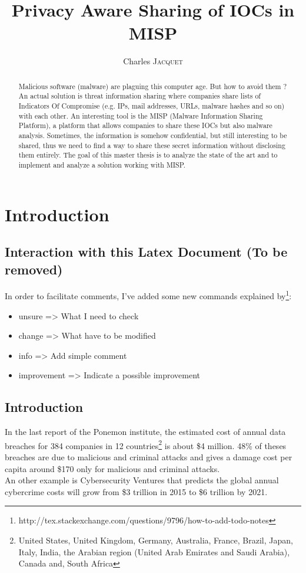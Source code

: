 \documentclass{eplmastersthesis}
\title{Privacy Aware Sharing of IOCs in MISP}	%
\author{Charles \textsc{Jacquet}}	%
\begin{document}
\maketitle					%
\thispagestyle{empty}		%


\begin{abstract} 
Malicious software (malware) are plaguing this computer age. But how to avoid them ?
An actual solution is threat information sharing where companies share lists of Indicators Of Compromise (e.g. IPs, mail addresses, URLs, malware hashes and so on) with each other.
An interesting tool is the MISP (Malware Information Sharing Platform), a platform that allows companies to share these IOCs but also malware analysis.
Sometimes, the information is somehow confidential, but still interesting to be shared, thus we need to find a way to share these secret information without disclosing them entirely.
The goal of this master thesis is to analyze the state of the art and to implement and analyze a solution working with MISP.
\end{abstract}

\tableofcontents

\chapter{Introduction}
\section{Interaction with this Latex Document (To be removed)}
In order to facilitate comments, I've added some new commands explained by\footnote{http://tex.stackexchange.com/questions/9796/how-to-add-todo-notes}:\\
\begin{itemize}
\item unsure => What I need to check
\item change => What have to be modified
\item info => Add simple comment
\item improvement => Indicate a possible improvement
\end{itemize}

\section{Introduction}
In the last report of the Ponemon institute, the estimated cost of annual data breaches for 384 companies in 12 countries\footnote{United States, United Kingdom, Germany, Australia, France, Brazil, Japan, Italy, India, the Arabian region (United Arab Emirates and Saudi Arabia), Canada and, South Africa} is about \$4 million. 48\% of theses breaches are due to malicious and criminal attacks and gives a damage cost per capita around \$170 only for malicious and criminal attacks. \\
An other example is Cybersecurity Ventures that predicts the global annual cybercrime costs will grow from \$3 trillion in 2015 to \$6 trillion by 2021.\\
\end{document}
